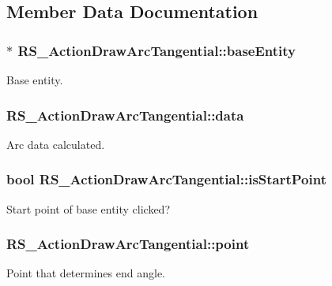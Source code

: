 \subsection{Member Data Documentation}
\hypertarget{classRS__ActionDrawArcTangential_a5b8b58b6b2d2eaacf4a123b2bb45ffb5}{
\subsubsection[{base\-Entity}]{$\ast$ R\-S\-\_\-\-Action\-Draw\-Arc\-Tangential\-::base\-Entity\hspace{0.3cm}{\ttfamily [protected]}}}\label{classRS__ActionDrawArcTangential_a5b8b58b6b2d2eaacf4a123b2bb45ffb5}
Base entity. \hypertarget{classRS__ActionDrawArcTangential_acd601829739530d471e4e4dec3f95465}{
\subsubsection[{data}]{ R\-S\-\_\-\-Action\-Draw\-Arc\-Tangential\-::data\hspace{0.3cm}{\ttfamily [protected]}}}\label{classRS__ActionDrawArcTangential_acd601829739530d471e4e4dec3f95465}
Arc data calculated. \hypertarget{classRS__ActionDrawArcTangential_a6371a1230344ad660d4dadeb42d0d036}{
\subsubsection[{is\-Start\-Point}]{\setlength{\rightskip}{0pt plus 5cm}bool R\-S\-\_\-\-Action\-Draw\-Arc\-Tangential\-::is\-Start\-Point\hspace{0.3cm}{\ttfamily [protected]}}}\label{classRS__ActionDrawArcTangential_a6371a1230344ad660d4dadeb42d0d036}
Start point of base entity clicked? \hypertarget{classRS__ActionDrawArcTangential_ac969ed1f418242c6d46439d9d0a9a584}{
\subsubsection[{point}]{ R\-S\-\_\-\-Action\-Draw\-Arc\-Tangential\-::point\hspace{0.3cm}{\ttfamily [protected]}}}\label{classRS__ActionDrawArcTangential_ac969ed1f418242c6d46439d9d0a9a584}
Point that determines end angle. 

